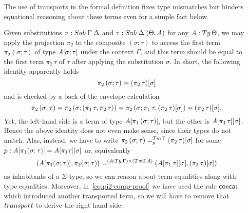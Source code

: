 \documentclass[a4paper,UKenglish,numberwithinsect,cleveref,thm-restate]{lipics-v2021}
\begin{document}
The use of transports in the formal definition fixes type mismatches but hinders equational reasoning about these terms even for a simple fact below.
\begin{example}\label{ex:pi2-comp}
  Given substitutions $\sigma : \Sub\;\Gamma\; \Delta$ and $\tau : \Sub\;\Delta\;(\Theta, A)$ for any $A : \Ty\,\Theta$, we may apply the projection $\pi_2$ to the composite $(\sigma; \tau)$ to access the first term $\pi_2(\sigma; \tau)$ of type ${{A}[ \sigma;\tau ]}$ under the context $\Gamma$, and this term should be equal to the first term $\pi_2\,\tau$ of $\tau$ after applying the substitution $\sigma$. 
  In short, the following identity apparently holds
  \[
    \pi_2\,(\sigma ; \tau) = {{(\pi_2\,\tau)}[ \sigma ]}
  \]
  and is checked by a back-of-the-envelope calculation
  \begin{equation} \label{eq:pi2-comp-proof}
    \pi_2\,(\sigma ; \tau) 
    = \pi_2\,(\sigma; (\pi_1\,\tau, \pi_2\,\tau))
    = \pi_2\,(\sigma;\pi_1\,\tau, {{(\pi_2\,\tau)}[ \sigma ]})
    = {{(\pi_2\,\tau)}[ \sigma ]}.
  \end{equation}
  Yet, the left-hand side is a term of type ${{A}[ \pi_1\,(\sigma;\tau) ]}$, but the other is ${{{{A}[ \pi_1\,\tau ]}}[ \sigma ]}$.
  Hence the above identity does not even make sense, since their types do not match.
  Alas, instead, we have to write $\pi_2\,(\sigma ; \tau) =^{\Tm\,\Gamma}_{p} \sub{(\pi_2\,\tau)}{\sigma}$ for some $p: {{A}[ \pi_1(\sigma; \tau) ]} = {{{{A}[ \pi_1\tau ]}}[ \sigma ]}$ or, equivalently
  \begin{equation}\label{eq:pi2-comp-real-proof}
    (\sub{A}{\pi_1(\sigma; \tau)}, \pi_2(\sigma; \tau)) =^{(A : \Ty\,\Gamma) \times (\Tm \Gamma A)} (\sub{\sub{A}{\pi_1\,\tau}}{\sigma}, \sub{(\pi_2\,\tau)}{\sigma})
  \end{equation}
  as inhabitants of a $\Sigma$-type, so we can reason about term equalities along with type equalities.
  Moreover, in~\eqref{eq:pi2-comp-proof} we have used the rule $\mathsf{concat}$ which introduced another transported term, so we will have to remove that $\transp$ to derive the right hand side.


\end{example}
\end{document}
